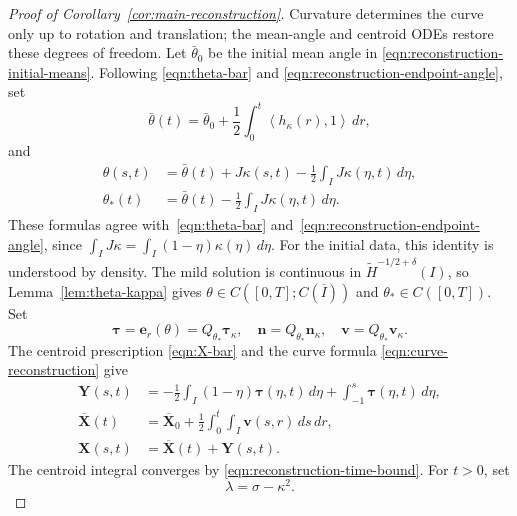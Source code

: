 \documentclass[11pt,reqno]{amsart}
\theoremstyle{plain}
\theoremstyle{definition}
\numberwithin{equation}{section}
\newcommand{\wt}[1]{\widetilde{#1}}
\newcommand{\bm}[1]{\boldsymbol{#1}}
\newcommand{\dual}[2]{\left\langle #1,#2 \right\rangle}
\newcommand{\tk}{\bm\tau_\kappa}
\newcommand{\nk}{\bm n_\kappa}
\newcommand{\thi}[1]{\wt H^{#1}(I)}
\begin{document}
\begin{proof}[Proof of Corollary~\ref{cor:main-reconstruction}]
Curvature determines the curve only up to rotation and translation;
the mean-angle and centroid ODEs restore these degrees of freedom.
Let $\bar\theta_0$ be the initial mean angle in
\eqref{eqn:reconstruction-initial-means}. Following
\eqref{eqn:theta-bar} and \eqref{eqn:reconstruction-endpoint-angle}, set
\begin{equation}\label{eqn:reconstructed-mean-angle}
    \bar\theta(t)
    =\bar\theta_0+\frac12\int_0^t\dual{h_\kappa(r)}{1}\,dr,
\end{equation}
and
\begin{equation}\label{eqn:reconstructed-angle}
\begin{aligned}
    \theta(s,t)
    &=\bar\theta(t)+J\kappa(s,t)
        -\frac12\int_I J\kappa(\eta,t)\,d\eta,\\
    \theta_*(t)
    &=\bar\theta(t)-\frac12\int_I J\kappa(\eta,t)\,d\eta.
\end{aligned}
\end{equation}
These formulas agree with~\eqref{eqn:theta-bar} and~\eqref{eqn:reconstruction-endpoint-angle}, since
$\int_I J\kappa=\int_I(1-\eta)\kappa(\eta)\,d\eta$.
For the initial data, this identity is understood by density.
The mild solution is continuous in $\thi{-1/2+\delta}$, so
Lemma~\ref{lem:theta-kappa} gives
$\theta\in C([0,T];C(\overline I))$ and $\theta_*\in C([0,T])$.
Set
\begin{equation}
    \bm\tau=\bm e_r(\theta)=Q_{\theta_*}\tk,\quad
    \bm n=Q_{\theta_*}\nk,\quad
    \bm v=Q_{\theta_*}\bm v_\kappa.
\end{equation}
The centroid prescription \eqref{eqn:X-bar} and the curve formula
\eqref{eqn:curve-reconstruction} give
\begin{equation}\label{eqn:reconstructed-centered-curve}
\begin{aligned}
    \bm Y(s,t)
    &=-\frac12\int_I(1-\eta)\bm\tau(\eta,t)\,d\eta
        +\int_{-1}^s\bm\tau(\eta,t)\,d\eta,\\
    \overline{\bm X}(t)
    &=\overline{\bm X}_0
        +\frac12\int_0^t\int_I\bm v(s,r)\,ds\,dr,\\
    \bm X(s,t)&=\overline{\bm X}(t)+\bm Y(s,t).
\end{aligned}
\end{equation}
The centroid integral converges by \eqref{eqn:reconstruction-time-bound}.
For $t>0$, set
\begin{equation}\label{eqn:reconstructed-tension}
    \lambda=\sigma-\kappa^2.
\end{equation}


\end{proof}
\end{document}
